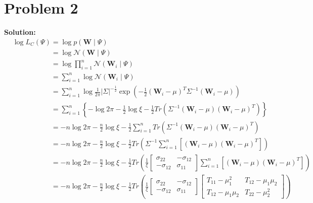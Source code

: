 \documentclass[11pt]{article}
\begin{document}
\section*{Problem 2}
\textbf{Solution:} 
	\begin{align}
		&\log L_C(\Psi) = \log p(\mathbf{W} \mid \Psi)\nonumber\\
		&\phantom{\log L_C(\Psi)} = \log \mathcal{N}(\mathbf{W} \mid \Psi)\nonumber\\
		&\phantom{\log L_C(\Psi)} = \log \prod_{i = 1}^n \mathcal{N}(\mathbf{W}_i \mid \Psi)\nonumber\\
		&\phantom{\log L_C(\Psi)} = \sum_{i = 1}^n \log \mathcal{N}(\mathbf{W}_i \mid \Psi)\nonumber\\
		&\phantom{\log L_C(\Psi)} = \sum_{i = 1}^n \log \frac{1}{2\pi} |\Sigma|^{-\frac{1}{2}} \exp\left(-\frac{1}{2} (\mathbf{W}_i - \mu)^T \Sigma^{-1} (\mathbf{W}_i - \mu)\right)\nonumber\\
		&\phantom{\log L_C(\Psi)} = \sum_{i = 1}^n \left\{-\log 2\pi - \frac{1}{2} \log \xi - \frac{1}{2} Tr\left(\Sigma^{-1} (\mathbf{W}_i - \mu)(\mathbf{W}_i - \mu)^T\right)\right\}\nonumber\\
		 &\phantom{\log L_C(\Psi)} = -n\log 2\pi - \frac{n}{2} \log \xi - \frac{1}{2} \sum_{i = 1}^n Tr\left(\Sigma^{-1} (\mathbf{W}_i - \mu)(\mathbf{W}_i - \mu)^T\right)\nonumber\\
		 &\phantom{\log L_C(\Psi)} = -n\log 2\pi - \frac{n}{2} \log \xi - \frac{1}{2} Tr\left(\Sigma^{-1} \sum_{i = 1}^n [(\mathbf{W}_i - \mu)(\mathbf{W}_i - \mu)^T]\right)\nonumber\\
		 &\phantom{\log L_C(\Psi)} = -n\log 2\pi - \frac{n}{2} \log \xi - \frac{1}{2} Tr\left(\frac{1}{\xi} 
		 \begin{bmatrix}
		 	\sigma_{22} & -\sigma_{12}\\
		 	-\sigma_{12} & \sigma_{11}
		 \end{bmatrix}
		  \sum_{i = 1}^n [(\mathbf{W}_i - \mu)(\mathbf{W}_i - \mu)^T]\right)\nonumber\\
		  &\phantom{\log L_C(\Psi)} = -n\log 2\pi - \frac{n}{2} \log \xi - \frac{1}{2} Tr\left(\frac{1}{\xi} 
		 \begin{bmatrix}
		 	\sigma_{22} & -\sigma_{12}\\
		 	-\sigma_{12} & \sigma_{11}
		 \end{bmatrix}
		 \begin{bmatrix}
		 	T_{11} - \mu_1^2 & T_{12} - \mu_1\mu_2\\
		 	T_{12} - \mu_1\mu_2 & T_{22} - \mu_2^2
		 \end{bmatrix}
		  \right)\nonumber
	\end{align}
\end{document}

